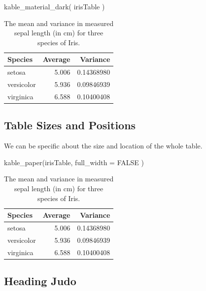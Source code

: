 \documentclass[
  letterpaper,
]{book}
\newenvironment{Shaded}{\begin{snugshade}}{\end{snugshade}}
\newcommand{\AttributeTok}[1]{\textcolor[rgb]{0.40,0.45,0.13}{#1}}
\newcommand{\ConstantTok}[1]{\textcolor[rgb]{0.56,0.35,0.01}{#1}}
\newcommand{\FunctionTok}[1]{\textcolor[rgb]{0.28,0.35,0.67}{#1}}
\newcommand{\NormalTok}[1]{\textcolor[rgb]{0.00,0.23,0.31}{#1}}
\begin{document}
\begin{Shaded}
\begin{Highlighting}[]
\FunctionTok{kable\_material\_dark}\NormalTok{( irisTable )}
\end{Highlighting}
\end{Shaded}

\begin{longtable}[t]{lrr}
\caption{\label{tab:unnamed-chunk-43}The mean and variance in measured sepal length (in cm) for three species of Iris.}\\
\toprule
Species & Average & Variance\\
\midrule
setosa & 5.006 & 0.14368980\\
versicolor & 5.936 & 0.09846939\\
virginica & 6.588 & 0.10400408\\
\bottomrule
\end{longtable}

\subsection{Table Sizes and Positions}\label{table-sizes-and-positions}

We can be specific about the size and location of the whole table.

\begin{Shaded}
\begin{Highlighting}[]
\FunctionTok{kable\_paper}\NormalTok{(irisTable, }\AttributeTok{full\_width =} \ConstantTok{FALSE}\NormalTok{ )}
\end{Highlighting}
\end{Shaded}

\begin{longtable}[t]{lrr}
\caption{\label{tab:unnamed-chunk-44}The mean and variance in measured sepal length (in cm) for three species of Iris.}\\
\toprule
Species & Average & Variance\\
\midrule
setosa & 5.006 & 0.14368980\\
versicolor & 5.936 & 0.09846939\\
virginica & 6.588 & 0.10400408\\
\bottomrule
\end{longtable}

\subsection{Heading Judo}\label{heading-judo}
\end{document}
